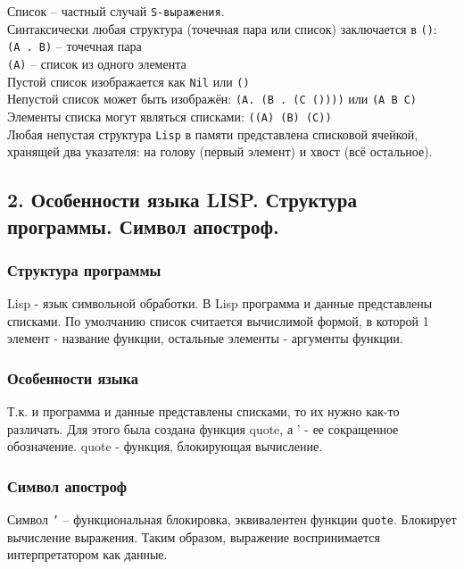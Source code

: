 \noindent Список -- частный случай {\texttt{S-выражения}}.\\
Синтаксически любая структура (точечная пара или список) заключается в {\texttt{()}}:\\
{\texttt{(A . B)}} -- точечная пара\\
{\texttt{(A)}} -- список из одного элемента\\
Пустой список изображается как {\texttt{Nil}} или {\texttt{()}}\\
Непустой список может быть изображён: {\texttt{(A. (B . (C ())))}} или {\texttt{(A B C)}}\\
Элементы списка могут являться списками: {\texttt{((A) (B) (C))}}\\
Любая непустая структура {\texttt{Lisp}} в памяти представлена списковой ячейкой, хранящей два указателя: на голову (первый элемент) и хвост (всё остальное).

\subsection*{2. Особенности языка LISP. Структура программы. Символ апостроф.}

\subsubsection*{Структура программы}

Lisp - язык символьной обработки. 
В Lisp программа и данные представлены списками.
По умолчанию список считается вычислимой формой, в которой 1 элемент - название функции, остальные элементы - аргументы функции.

\subsubsection*{Особенности языка}

Т.к. и программа и данные представлены списками, то их нужно как-то различать. 
Для этого была создана функция quote, а ' - ее сокращенное обозначение. 
quote - функция, блокирующая вычисление.

\subsubsection*{Символ апостроф}

Символ {\texttt{'}} -- функциональная блокировка, эквивалентен функции {\texttt{quote}}. Блокирует вычисление выражения. Таким образом, выражение воспринимается интерпретатором как данные.

